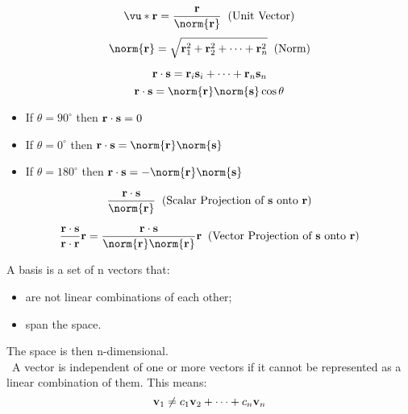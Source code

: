 
\begin{minipage}{0.48\textwidth}
	
	
	\vspace{-5mm}
	\[ \vu*\rvec = \frac{\rvec}{\norm{\rvec}} \;\; \text{(Unit Vector)}\]
	\[ \norm{\rvec} = \sqrt{\rvec^2_1 + \rvec^2_2 + \cdots + \rvec^2_n} \;\; \text{(Norm)} \]
	\divider
	
	\vspace{-5mm}
	\[ \mathbf{r} \cdot \mathbf{s} = \mathbf{r}_{i} \mathbf{s}_{i} + \dots + \mathbf{r}_{n} \mathbf{s}_{n} \]
	\[ \rvec \cdot \svec = \norm{\rvec} \norm{\svec} \cos{\theta} \]
	\begin{itemize}
		\item If $\theta = 90^{\circ}$ then $\mathbf{r} \cdot \mathbf{s} = 0 $
		\item If $\theta = 0^{\circ}$ then $\rvec \cdot \svec = \norm{\rvec} \norm{\svec} $
		\item If $\theta = 180^{\circ}$ then $\rvec \cdot \svec = - \norm{\rvec} \norm{\svec} $
	\end{itemize}
	\divider
	
	\[ \frac{\rvec \cdot \svec}{\norm{\rvec}} \;\; \text{(Scalar Projection of $\svec$ onto $\rvec$)}\]
	
	\[ \frac{\rvec \cdot \svec}{\rvec \cdot \rvec} \rvec = \frac{\rvec \cdot \svec}{\norm{\rvec} \norm{\rvec}} \rvec \;\; \text{(Vector Projection of $\svec$ onto $\rvec$)}\]
	\divider
	
	\vspace{0.15cm}
	A basis is a set of n vectors that:
	\begin{itemize}[topsep=2.5pt]
		\item are not linear combinations of each other;
		\item span the space.
	\end{itemize}
	The space is then n-dimensional. \\
	
	{\small \faLightbulb} \ A vector is independent of one or more vectors if it cannot be represented as a linear combination of them. This means:
	\[ \mathbf{v}_1 \not = c_1 \mathbf{v}_{2} + \dots + c_n \mathbf{v}_{n} \]
	
	\vspace{0.5cm}
	

\end{minipage}
